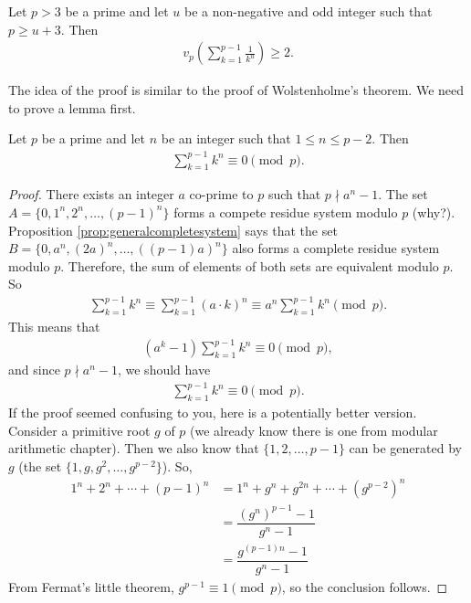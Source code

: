 \documentclass{subfile}
\begin{document}
	\begin{theorem}
		Let $p>3$ be a prime and let $u$ be a non-negative and odd integer such that $p \geq u+3$. Then
		\begin{align*}
		v_{p}\left(\sum_{k = 1}^{p - 1}\frac {1}{k^{u}}\right)\geq 2.
		\end{align*}
	\end{theorem}
	
	The idea of the proof is similar to the proof of Wolstenholme's theorem. We need to prove a lemma first.
	
	\begin{lemma}\label{lem:darijwolstproof}
		Let $p$ be a prime and let $n$ be an integer such that $1 \leq n \leq p-2$. Then
		\begin{align*}
		\sum_{k = 1}^{p - 1} k^n \equiv 0 \pmod p.
		\end{align*}
	\end{lemma}
	
	\begin{proof}
		There exists an integer $a$ co-prime to $p$ such that $p \nmid a^n -1$. The set $A= \{0, 1^n, 2^n, \ldots, (p-1)^n\}$ forms a compete residue system modulo $p$ (why?). Proposition \eqref{prop:generalcompletesystem} says that the set $B=\{0, a^n, (2a)^n, \ldots, ((p-1)a)^n\}$ also forms a complete residue system modulo $p$. Therefore, the sum of elements of both sets are equivalent modulo $p$. So
		\begin{align*}
		\sum_{k = 1}^{p - 1} k^n \equiv \sum_{k = 1}^{p - 1} (a \cdot k)^n \equiv a^n \sum_{k = 1}^{p - 1} k^n \pmod p.
		\end{align*}
		This means that
			\begin{align*}
				\left(a^k - 1\right) \sum_{k = 1}^{p - 1} k^n \equiv 0 \pmod p,
			\end{align*}
		and since $p \nmid a^n -1$, we should have
		\begin{align*}
		\sum_{k = 1}^{p - 1} k^n \equiv 0 \pmod p.
		\end{align*}
		If the proof seemed confusing to you, here is a potentially better version. Consider a primitive root $g$ of $p$ (we already know there is one from modular arithmetic chapter). Then we also know that $\{1,2,\ldots,p-1\}$ can be generated by $g$ (the set $\{1,g,g^2,\ldots,g^{p-2}\}$). So,
			\begin{align*}
				1^n+2^n+\cdots+(p-1)^n & = 1^n+g^n+g^{2n}+\cdots+\left(g^{p-2}\right)^n\\
										&= \dfrac{(g^n)^{p-1}-1}{g^n-1}\\
										& = \dfrac{g^{(p-1)n}-1}{g^n-1}	
			\end{align*}
		From Fermat's little theorem, $g^{p-1}\equiv1\pmod p$, so the conclusion follows.
	\end{proof}
	
\end{document}
